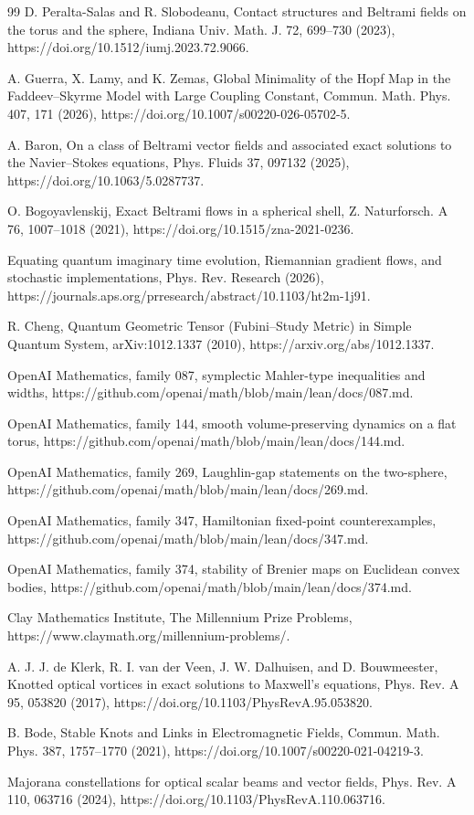 \documentclass[10pt,letterpaper]{article}
\theoremstyle{remark}
\begin{document}
\begin{thebibliography}{99}
 D. Peralta-Salas and R. Slobodeanu, Contact structures and Beltrami fields on the torus and the sphere, Indiana Univ. Math. J. 72, 699–730 (2023), https://doi.org/10.1512/iumj.2023.72.9066.

 A. Guerra, X. Lamy, and K. Zemas, Global Minimality of the Hopf Map in the Faddeev–Skyrme Model with Large Coupling Constant, Commun. Math. Phys. 407, 171 (2026), https://doi.org/10.1007/s00220-026-05702-5.

 A. Baron, On a class of Beltrami vector fields and associated exact solutions to the Navier–Stokes equations, Phys. Fluids 37, 097132 (2025), https://doi.org/10.1063/5.0287737.

 O. Bogoyavlenskij, Exact Beltrami flows in a spherical shell, Z. Naturforsch. A 76, 1007–1018 (2021), https://doi.org/10.1515/zna-2021-0236.

 Equating quantum imaginary time evolution, Riemannian gradient flows, and stochastic implementations, Phys. Rev. Research (2026), https://journals.aps.org/prresearch/abstract/10.1103/ht2m-1j91.

 R. Cheng, Quantum Geometric Tensor (Fubini–Study Metric) in Simple Quantum System, arXiv:1012.1337 (2010), https://arxiv.org/abs/1012.1337.

 OpenAI Mathematics, family 087, symplectic Mahler-type inequalities and widths, https://github.com/openai/math/blob/main/lean/docs/087.md.

 OpenAI Mathematics, family 144, smooth volume-preserving dynamics on a flat torus, https://github.com/openai/math/blob/main/lean/docs/144.md.

 OpenAI Mathematics, family 269, Laughlin-gap statements on the two-sphere, https://github.com/openai/math/blob/main/lean/docs/269.md.

 OpenAI Mathematics, family 347, Hamiltonian fixed-point counterexamples, https://github.com/openai/math/blob/main/lean/docs/347.md.

 OpenAI Mathematics, family 374, stability of Brenier maps on Euclidean convex bodies, https://github.com/openai/math/blob/main/lean/docs/374.md.

 Clay Mathematics Institute, The Millennium Prize Problems, https://www.claymath.org/millennium-problems/.

 A. J. J. de Klerk, R. I. van der Veen, J. W. Dalhuisen, and D. Bouwmeester, Knotted optical vortices in exact solutions to Maxwell’s equations, Phys. Rev. A 95, 053820 (2017), https://doi.org/10.1103/PhysRevA.95.053820.

 B. Bode, Stable Knots and Links in Electromagnetic Fields, Commun. Math. Phys. 387, 1757–1770 (2021), https://doi.org/10.1007/s00220-021-04219-3.

 Majorana constellations for optical scalar beams and vector fields, Phys. Rev. A 110, 063716 (2024), https://doi.org/10.1103/PhysRevA.110.063716.

\end{thebibliography}
\end{document}
